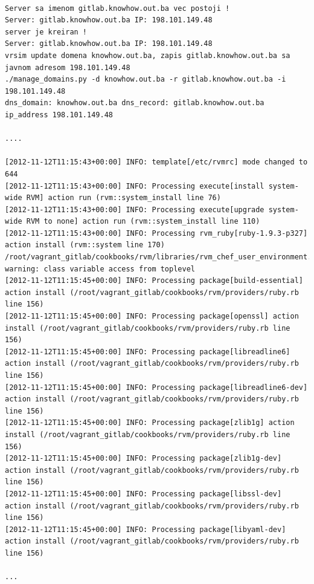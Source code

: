 \begin{lstlisting}

Server sa imenom gitlab.knowhow.out.ba vec postoji !
Server: gitlab.knowhow.out.ba IP: 198.101.149.48
server je kreiran !
Server: gitlab.knowhow.out.ba IP: 198.101.149.48
vrsim update domena knowhow.out.ba, zapis gitlab.knowhow.out.ba sa javnom adresom 198.101.149.48
./manage_domains.py -d knowhow.out.ba -r gitlab.knowhow.out.ba -i 198.101.149.48
dns_domain: knowhow.out.ba dns_record: gitlab.knowhow.out.ba ip_address 198.101.149.48

....

[2012-11-12T11:15:43+00:00] INFO: template[/etc/rvmrc] mode changed to 644
[2012-11-12T11:15:43+00:00] INFO: Processing execute[install system-wide RVM] action run (rvm::system_install line 76)
[2012-11-12T11:15:43+00:00] INFO: Processing execute[upgrade system-wide RVM to none] action run (rvm::system_install line 110)
[2012-11-12T11:15:43+00:00] INFO: Processing rvm_ruby[ruby-1.9.3-p327] action install (rvm::system line 170)
/root/vagrant_gitlab/cookbooks/rvm/libraries/rvm_chef_user_environment.rb:36: warning: class variable access from toplevel
[2012-11-12T11:15:45+00:00] INFO: Processing package[build-essential] action install (/root/vagrant_gitlab/cookbooks/rvm/providers/ruby.rb line 156)
[2012-11-12T11:15:45+00:00] INFO: Processing package[openssl] action install (/root/vagrant_gitlab/cookbooks/rvm/providers/ruby.rb line 156)
[2012-11-12T11:15:45+00:00] INFO: Processing package[libreadline6] action install (/root/vagrant_gitlab/cookbooks/rvm/providers/ruby.rb line 156)
[2012-11-12T11:15:45+00:00] INFO: Processing package[libreadline6-dev] action install (/root/vagrant_gitlab/cookbooks/rvm/providers/ruby.rb line 156)
[2012-11-12T11:15:45+00:00] INFO: Processing package[zlib1g] action install (/root/vagrant_gitlab/cookbooks/rvm/providers/ruby.rb line 156)
[2012-11-12T11:15:45+00:00] INFO: Processing package[zlib1g-dev] action install (/root/vagrant_gitlab/cookbooks/rvm/providers/ruby.rb line 156)
[2012-11-12T11:15:45+00:00] INFO: Processing package[libssl-dev] action install (/root/vagrant_gitlab/cookbooks/rvm/providers/ruby.rb line 156)
[2012-11-12T11:15:45+00:00] INFO: Processing package[libyaml-dev] action install (/root/vagrant_gitlab/cookbooks/rvm/providers/ruby.rb line 156)

...


\end{lstlisting}
